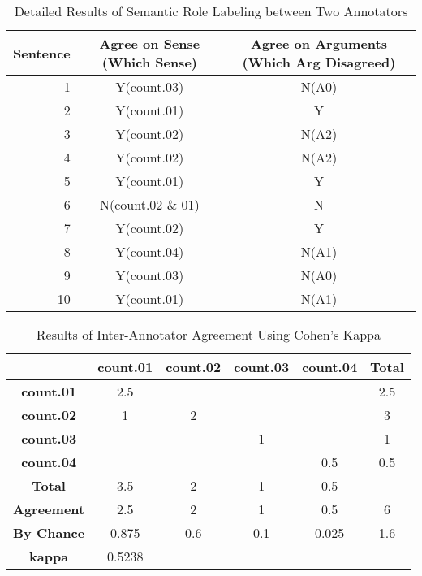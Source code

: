 \documentclass[11pt]{article} %
\begin{document}
\begin{table}[h]
    \begin{center}
        \caption{Detailed Results of Semantic Role Labeling between Two Annotators}
        \label{tab:table1}
        \begin{tabular}{r|c|c}
            \textbf{Sentence} & \textbf{Agree on Sense (Which Sense)} & \textbf{Agree on Arguments (Which Arg Disagreed)}\\
            \hline
            1 & Y(count.03) & N(A0)\\
            2 & Y(count.01) & Y\\
            3 & Y(count.02) & N(A2)\\
            4 & Y(count.02) & N(A2)\\
            5 & Y(count.01) & Y\\
            6 & N(count.02 \& 01) & N\\
            7 & Y(count.02) & Y\\
            8 & Y(count.04) & N(A1)\\
            9 & Y(count.03) & N(A0)\\
            10 & Y(count.01) & N(A1)\\
        \end{tabular}
    \end{center}
\end{table}

\begin{table}[h]
    \begin{center}
        \caption{Results of Inter-Annotator Agreement Using Cohen's Kappa}
        \label{tab:table2}
        \begin{tabular}{c|c|c|c|c|c}
            \textbf{} & \textbf{count.01} & \textbf{count.02} & \textbf{count.03} & \textbf{count.04} & \textbf{Total}\\
            \hline
            \textbf{count.01} & 2.5 & & & & 2.5\\
            \hline
            \textbf{count.02} & 1 & 2 & & & 3\\
            \hline
            \textbf{count.03} & & & 1 & & 1\\
            \hline
            \textbf{count.04} & & & & 0.5 & 0.5\\
            \hline
            \textbf{Total} & 3.5 & 2 & 1 & 0.5 &\\
            \hline
            \hline
            \textbf{Agreement} & 2.5 & 2 & 1 & 0.5 & 6\\
            \hline
            \textbf{By Chance} & 0.875 & 0.6 & 0.1 & 0.025 & 1.6\\
            \hline
            \hline
            \textbf{kappa} & 0.5238\\
        \end{tabular}
    \end{center}
\end{table}
\end{document}
